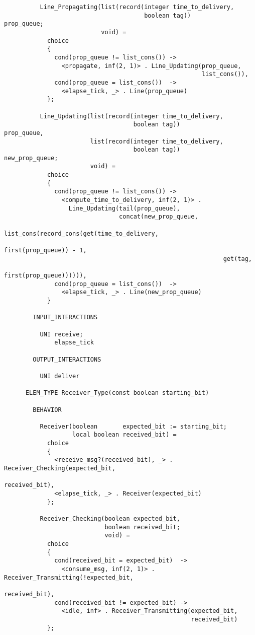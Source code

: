 \begin{verbatim}
          Line_Propagating(list(record(integer time_to_delivery,
                                       boolean tag))             prop_queue;
                           void) =
            choice
            {
              cond(prop_queue != list_cons()) ->
                <propagate, inf(2, 1)> . Line_Updating(prop_queue,
                                                       list_cons()),
              cond(prop_queue = list_cons())  ->
                <elapse_tick, _> . Line(prop_queue)
            };

          Line_Updating(list(record(integer time_to_delivery,
                                    boolean tag))             prop_queue,
                        list(record(integer time_to_delivery,
                                    boolean tag))             new_prop_queue;
                        void) =
            choice
            {
              cond(prop_queue != list_cons()) ->
                <compute_time_to_delivery, inf(2, 1)> .
                  Line_Updating(tail(prop_queue),
                                concat(new_prop_queue,
                                       list_cons(record_cons(get(time_to_delivery,
                                                                 first(prop_queue)) - 1,
                                                             get(tag,
                                                                 first(prop_queue)))))),
              cond(prop_queue = list_cons())  ->
                <elapse_tick, _> . Line(new_prop_queue)
            }

        INPUT_INTERACTIONS

          UNI receive;
              elapse_tick

        OUTPUT_INTERACTIONS

          UNI deliver

      ELEM_TYPE Receiver_Type(const boolean starting_bit)

        BEHAVIOR

          Receiver(boolean       expected_bit := starting_bit;
                   local boolean received_bit) =
            choice
            {
              <receive_msg?(received_bit), _> . Receiver_Checking(expected_bit,
                                                                  received_bit),
              <elapse_tick, _> . Receiver(expected_bit)
            };

          Receiver_Checking(boolean expected_bit,
                            boolean received_bit;
                            void) =
            choice
            {
              cond(received_bit = expected_bit)  ->
                <consume_msg, inf(2, 1)> . Receiver_Transmitting(!expected_bit,
                                                                 received_bit),
              cond(received_bit != expected_bit) ->
                <idle, inf> . Receiver_Transmitting(expected_bit,
                                                    received_bit)
            };


\end{verbatim}
